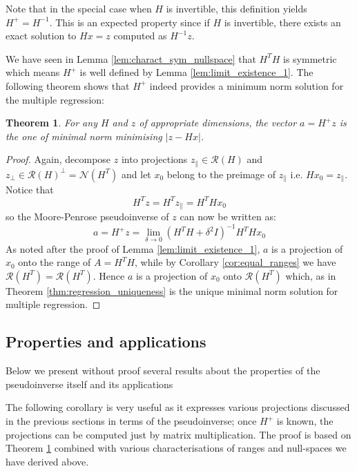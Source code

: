 \documentclass[a4paper]{article}
\theoremstyle{break}
\newtheorem{theorem}{Theorem}[section]
\newcommand{\Nu}{\mathcal{N}}
\newcommand{\Ra}{\mathcal{R}}
\newcommand{\pll}{\parallel}
\begin{document}
Note that in the special case when $H$ is invertible, this definition yields $H^+ = H^{-1}$. This is an expected property since if $H$ is invertible, there exists an exact solution to $ H x = z $ computed as $ H^{-1} z$.

We have seen in Lemma \ref{lem:charact_sym_nullspace} that $H^T H$ is symmetric which means $H^+$ is well defined by Lemma \ref{lem:limit_existence_1}. The following theorem shows that $ H^+$ indeed provides a minimum norm solution for the multiple regression:

\begin{theorem}\label{thm:mp_solves_regression}
    For any $H$ and $z$ of appropriate dimensions, the vector $a = H^+ z$ is the one of minimal norm minimising $ | z - H x | $.
\end{theorem}

\begin{proof}
    Again, decompose $z$ into projections $z_\pll \in \Ra(H)$ and $z_\perp \in \Ra(H)^\perp = \Nu(H^T)$ and let $x_0$ belong to the preimage of $z_\pll$ i.e. $H x_0 = z_\pll$. Notice that
        $$ H^T z = H^T z_\pll = H^T H x_0$$
    so the Moore-Penrose pseudoinverse of $z$ can now be written as:
        $$ a = H^+ z
         = \lim_{\delta \to 0} (H^T H + \delta^2 I)^{-1} H^T H x_0
        $$
    As noted after the proof of Lemma \ref{lem:limit_existence_1}, $a$ is a projection of $x_0$ onto the range of $ A = H^T H $, while by Corollary \ref{cor:equal_ranges} we have $\Ra(H^T) = \Ra(H^T)$.
    Hence $a$ is a projection of $x_0$ onto $\Ra(H^T)$ which, as in Theorem \ref{thm:regression_uniqueness} is the unique minimal norm solution for multiple regression.
\end{proof}

\subsection{Properties and applications}

Below we present without proof several results about the properties of the pseudoinverse itself and its applications

The following corollary is very useful as it expresses various projections discussed in the previous sections in terms of the pseudoinverse; once $ H^+ $ is known, the projections can be computed just by matrix multiplication. The proof is based on Theorem \ref{thm:mp_solves_regression} combined with various characterisations of ranges and null-spaces we have derived above.
\end{document}

